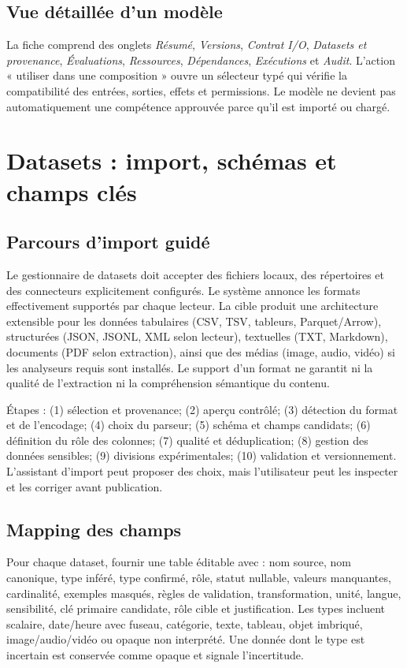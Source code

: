 \documentclass[11pt,a4paper]{article}
\begin{document}
\subsection{Vue détaillée d'un modèle}
La fiche comprend des onglets \emph{Résumé}, \emph{Versions}, \emph{Contrat I/O}, \emph{Datasets et provenance}, \emph{Évaluations}, \emph{Ressources}, \emph{Dépendances}, \emph{Exécutions} et \emph{Audit}. L'action « utiliser dans une composition » ouvre un sélecteur typé qui vérifie la compatibilité des entrées, sorties, effets et permissions. Le modèle ne devient pas automatiquement une compétence approuvée parce qu'il est importé ou chargé.

\section{Datasets : import, schémas et champs clés}
\subsection{Parcours d'import guidé}
Le gestionnaire de datasets doit accepter des fichiers locaux, des répertoires et des connecteurs explicitement configurés. Le système annonce les formats effectivement supportés par chaque lecteur. La cible produit une architecture extensible pour les données tabulaires (CSV, TSV, tableurs, Parquet/Arrow), structurées (JSON, JSONL, XML selon lecteur), textuelles (TXT, Markdown), documents (PDF selon extraction), ainsi que des médias (image, audio, vidéo) si les analyseurs requis sont installés. Le support d'un format ne garantit ni la qualité de l'extraction ni la compréhension sémantique du contenu.

Étapes : (1) sélection et provenance; (2) aperçu contrôlé; (3) détection du format et de l'encodage; (4) choix du parseur; (5) schéma et champs candidats; (6) définition du rôle des colonnes; (7) qualité et déduplication; (8) gestion des données sensibles; (9) divisions expérimentales; (10) validation et versionnement. L'assistant d'import peut proposer des choix, mais l'utilisateur peut les inspecter et les corriger avant publication.

\subsection{Mapping des champs}
Pour chaque dataset, fournir une table éditable avec : nom source, nom canonique, type inféré, type confirmé, rôle, statut nullable, valeurs manquantes, cardinalité, exemples masqués, règles de validation, transformation, unité, langue, sensibilité, clé primaire candidate, rôle cible et justification. Les types incluent scalaire, date/heure avec fuseau, catégorie, texte, tableau, objet imbriqué, image/audio/vidéo ou opaque non interprété. Une donnée dont le type est incertain est conservée comme opaque et signale l'incertitude.
\end{document}
